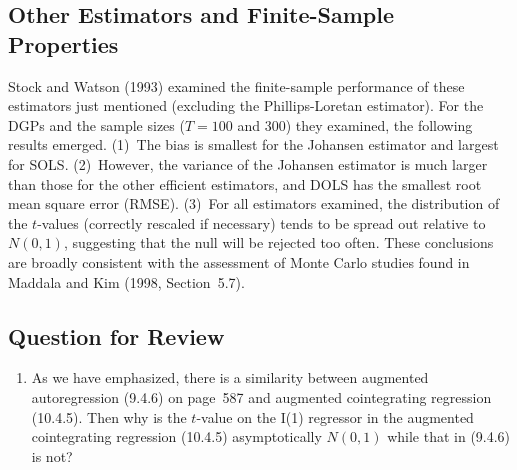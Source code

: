 \subsection*{Other Estimators and Finite-Sample Properties}

Stock and Watson (1993) examined the finite-sample performance of these estima\-tors
just mentioned (excluding the Phillips-Loretan estimator). For the DGPs and
the sample sizes ($T = 100$ and 300) they examined, the following results emerged.
(1)~The bias is smallest for the Johansen estimator and largest for SOLS. (2)~How\-ever,
the variance of the Johansen estimator is much larger than those for the other
efficient estimators, and DOLS has the smallest root mean square error (RMSE).
(3)~For all estimators examined, the distribution of the $t$-values (correctly rescaled
if necessary) tends to be spread out relative to $N(0, 1)$, suggesting that the null will
be rejected too often. These conclusions are broadly consistent with the assessment
of Monte Carlo studies found in Maddala and Kim (1998, Section~5.7).

\subsection*{Question for Review}

\begin{enumerate}
\item As we have emphasized, there is a similarity between augmented autoregres\-sion
  (9.4.6) on page~587 and augmented cointegrating regression (10.4.5). Then
  why is the $t$-value on the I(1) regressor in the augmented cointegrating regres\-sion
  (10.4.5) asymptotically $N(0, 1)$ while that in (9.4.6) is not?
\end{enumerate}
